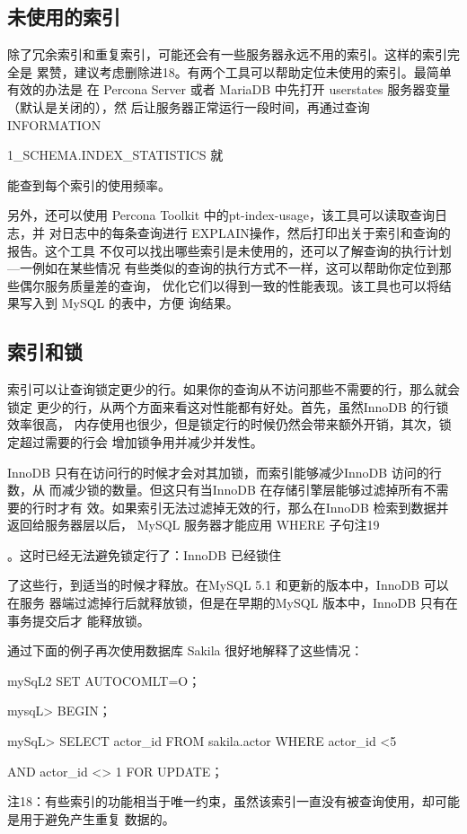 \subsection{未使用的索引}
除了冗余索引和重复索引，可能还会有一些服务器永远不用的索引。这样的索引完全是
累赞，建议考虑删除进18。有两个工具可以帮助定位未使用的索引。最简单有效的办法是
在 Percona Server 或者 MariaDB 中先打开 userstates 服务器变量（默认是关闭的），然
后让服务器正常运行一段时间，再通过查询 INFORMATION

1\_SCHEMA.INDEX\_STATISTICS 就

能查到每个索引的使用频率。

另外，还可以使用 Percona Toolkit 中的pt-index-usage，该工具可以读取查询日志，并
对日志中的每条查询进行 EXPLAIN操作，然后打印出关于索引和查询的报告。这个工具
不仅可以找出哪些索引是未使用的，还可以了解查询的执行计划—一例如在某些情况
有些类似的查询的执行方式不一样，这可以帮助你定位到那些偶尔服务质量差的查询，
优化它们以得到一致的性能表现。该工具也可以将结果写入到 MySQL 的表中，方便
询结果。

\subsection{索引和锁}
索引可以让查询锁定更少的行。如果你的查询从不访问那些不需要的行，那么就会锁定
更少的行，从两个方面来看这对性能都有好处。首先，虽然InnoDB 的行锁效率很高，
内存使用也很少，但是锁定行的时候仍然会带来额外开销，其次，锁定超过需要的行会
增加锁争用并减少并发性。

InnoDB 只有在访问行的时候才会对其加锁，而索引能够减少InnoDB 访问的行数，从
而减少锁的数量。但这只有当InnoDB 在存储引擎层能够过滤掉所有不需要的行时才有
效。如果索引无法过滤掉无效的行，那么在InnoDB 检索到数据并返回给服务器层以后，
MySQL 服务器才能应用 WHERE 子句注19

。这时已经无法避免锁定行了：InnoDB 已经锁住

了这些行，到适当的时候才释放。在MySQL 5.1 和更新的版本中，InnoDB 可以在服务
器端过滤掉行后就释放锁，但是在早期的MySQL 版本中，InnoDB 只有在事务提交后才
能释放锁。

通过下面的例子再次使用数据库 Sakila 很好地解释了这些情况：

mySqL2 SET AUTOCOMLT=O；

mysqL> BEGIN；

mySqL> SELECT actor\_id FROM sakila.actor WHERE actor\_id <5

AND actor\_id <> 1 FOR UPDATE；

注18：有些索引的功能相当于唯一约束，虽然该索引一直没有被查询使用，却可能是用于避免产生重复
数据的。

